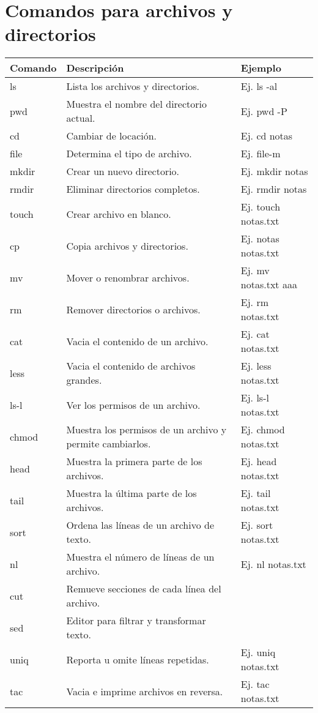 \documentclass[10pt]{article}
\begin{document}
\section{Comandos para archivos y directorios}
\begin{tabular}{||l|l|l||}
\hline \hline
Comando & Descripción & Ejemplo \\ \hline
ls & Lista los archivos y  directorios. & Ej. ls -al \\ \hline
pwd & Muestra el nombre del directorio actual. & Ej. pwd -P \\ \hline
cd & Cambiar de locación. & Ej. cd notas \\ \hline
file & Determina el tipo de archivo. & Ej. file-m \\ \hline
mkdir & Crear un nuevo directorio. & Ej. mkdir notas \\ \hline
rmdir & Eliminar directorios completos. & Ej. rmdir notas \\ \hline
touch & Crear archivo en blanco. & Ej. touch notas.txt \\ \hline
cp & Copia archivos y directorios. & Ej. notas notas.txt  \\ \hline
mv & Mover o renombrar archivos. & Ej. mv notas.txt aaa \\ \hline
rm & Remover directorios o archivos. & Ej. rm notas.txt \\ \hline
cat & Vacia el contenido de un archivo. & Ej. cat notas.txt \\ \hline
less & Vacia el contenido de archivos grandes. & Ej. less notas.txt \\ \hline
ls-l & Ver los permisos de un archivo. &  Ej. ls-l notas.txt\\ \hline
chmod & Muestra los permisos de un archivo y permite cambiarlos. & Ej. chmod notas.txt \\ \hline
head & Muestra la primera parte de los archivos. & Ej. head notas.txt \\ \hline
tail & Muestra la última parte de los archivos. & Ej. tail notas.txt \\ \hline
sort & Ordena las líneas de un archivo de texto. & Ej. sort notas.txt \\ \hline
nl & Muestra el número de líneas de un archivo. & Ej. nl notas.txt \\ \hline
cut & Remueve secciones de cada línea del archivo. & \\ \hline
sed & Editor para filtrar y transformar texto. & \\ \hline
uniq & Reporta u omite líneas repetidas. & Ej. uniq notas.txt \\ \hline
tac & Vacia e imprime archivos en reversa. & Ej. tac notas.txt \\ \hline \hline
\end{tabular}
\end{document}
